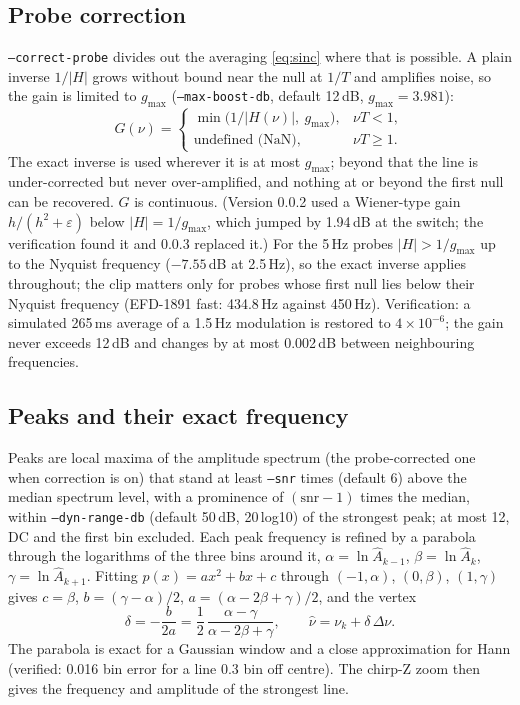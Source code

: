 \documentclass[10pt,letterpaper]{article}
\numberwithin{equation}{section}
\begin{document}
\subsection{Probe correction}\label{sec:correction}
\texttt{--correct-probe} divides out the averaging \eqref{eq:sinc} where that is
possible. A plain inverse $1/|H|$ grows without bound near the null at $1/T$ and
amplifies noise, so the gain is limited to $g_\mathrm{max}$ (\texttt{--max-boost-db},
default 12\,dB, $g_\mathrm{max} = 3.981$):
\begin{equation}
G(\nu) = \begin{cases}\min\!\big(1/|H(\nu)|,\ g_\mathrm{max}\big), & \nu T < 1,\\
\text{undefined (NaN)}, & \nu T \ge 1.\end{cases}
\end{equation}
The exact inverse is used wherever it is at most $g_\mathrm{max}$; beyond that the
line is under-corrected but never over-amplified, and nothing at or beyond the
first null can be recovered. $G$ is continuous. (Version 0.0.2 used a
Wiener-type gain $h/(h^2+\varepsilon)$ below $|H| = 1/g_\mathrm{max}$, which jumped
by 1.94\,dB at the switch; the verification found it and 0.0.3 replaced it.) For
the 5\,Hz probes $|H| > 1/g_\mathrm{max}$ up to the Nyquist frequency
($-7.55$\,dB at 2.5\,Hz), so the exact inverse applies throughout; the clip
matters only for probes whose first null lies below their Nyquist frequency
(EFD-1891 fast: 434.8\,Hz against 450\,Hz). Verification: a
simulated 265\,ms average of a 1.5\,Hz modulation is restored to
$4\times10^{-6}$; the gain never exceeds 12\,dB and changes by at most 0.002\,dB
between neighbouring frequencies.

\subsection{Peaks and their exact frequency}\label{sec:peaks}
Peaks are local maxima of the amplitude spectrum (the probe-corrected one when
correction is on) that stand at least \texttt{--snr} times (default 6) above the
median spectrum level, with a prominence of $(\mathrm{snr}-1)$ times the median,
within \texttt{--dyn-range-db} (default 50\,dB, 20\,log10) of the strongest peak; at
most 12, DC and the first bin excluded. Each peak frequency is refined by a
parabola through the logarithms of the three bins around it,
$\alpha = \ln\hat{A}_{k-1}$, $\beta = \ln\hat{A}_k$, $\gamma = \ln\hat{A}_{k+1}$.
Fitting $p(x) = a x^2 + bx + c$ through $(-1,\alpha)$, $(0,\beta)$, $(1,\gamma)$ gives
$c = \beta$, $b = (\gamma-\alpha)/2$, $a = (\alpha - 2\beta + \gamma)/2$, and the vertex
\begin{equation}
\delta = -\frac{b}{2a} = \frac{1}{2}\,\frac{\alpha - \gamma}{\alpha - 2\beta + \gamma},
\qquad \hat{\nu} = \nu_k + \delta\,\Delta\nu .
\end{equation}
The parabola is exact for a Gaussian window and a close approximation for
Hann (verified: 0.016 bin error for a line 0.3 bin off centre). The chirp-Z
zoom then gives the frequency and amplitude of the strongest line.
\end{document}
